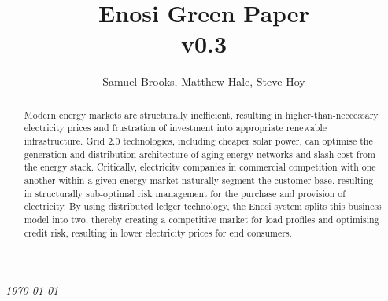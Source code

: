 \documentclass{article}
\theoremstyle{definition}
\theoremstyle{plain} %
\begin{document}

\title{Enosi Green Paper\\ v0.3}
\author{Samuel Brooks, Matthew Hale, Steve Hoy}
\date{}

\maketitle

\hfill

\begin{abstract}
\noindent Modern energy markets are structurally inefficient, resulting in higher-than-neccessary electricity prices and frustration of investment into appropriate renewable infrastructure.
Grid 2.0 technologies, including cheaper solar power, can optimise the generation and distribution architecture of aging energy networks and slash cost from the energy stack.
Critically, electricity companies in commercial competition with one another within a given energy market naturally segment the customer base, resulting in structurally sub-optimal risk management for the purchase and provision of electricity. By using distributed ledger technology, the Enosi system splits this business model into two, thereby creating a competitive market for load profiles and optimising credit risk, resulting in lower electricity prices for end consumers.
\end{abstract}
\vspace{20mm}
\begin{center}
  \small{\textit{\today}}
\end{center}


\pagebreak

\tableofcontents


\pagebreak

%
%
%



%
%

%
%
\end{document}
